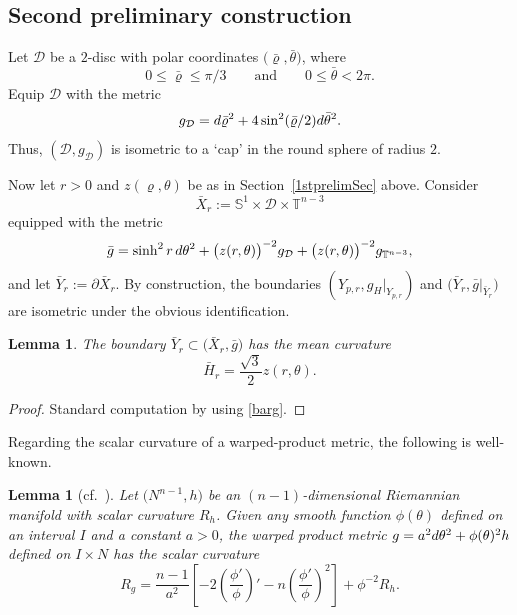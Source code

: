 \documentclass[11pt]{article}
\numberwithin{equation}{section}
\numberwithin{equation}{section}
\newtheorem{Lemma}[Theorem]{Lemma}
\def\S{\mathbb{S}}
\def\T{\mathbb{T}}
\def\Dcal{\mathcal{D}}
\def\ed{{\rm d}}
\begin{document}
\subsection{Second preliminary construction}\label{2ndprelimSec}
Let $\Dcal$ be a $2$-disc with polar coordinates $\bigl(\bar\varrho,\bar\theta\bigr)$, where
\[
	0\le \bar\varrho\le \pi/3 \qquad \mbox{and}\qquad 0\le \bar \theta<2\pi.
\]
Equip $\Dcal$ with the metric
\[
	g_\Dcal = \ed\bar\varrho^2 + 4\sin^2(\bar\varrho/2)\ed\bar\theta^2.
\]
Thus, $(\Dcal, g_\Dcal)$ is isometric to a `cap' in the round sphere of radius $2$.

Now let $r >0$ and $z(\varrho,\theta)$ be as in Section~\ref{1stprelimSec} above. Consider
\begin{equation*}
	\bar X_r := \S^1 \times \Dcal \times \T^{n-3}
\end{equation*}
equipped with the metric
\begin{equation}\label{barg}
\bar g =\sinh^ 2r \,\ed\theta^2 +\bigl(z(r,\theta)\bigr)^{-2} g_\Dcal+\bigl(z(r,\theta)\bigr)^{-2}g_{\T^{n-3}},
\end{equation}
and let $\bar Y_r := \partial \bar X_r$.
By construction, the boundaries $(Y_{p,r}, g_H|_{Y_{p,r}})$ and $\bigl(\bar Y_r, \bar g|_{\bar Y_r}\bigr)$ are isometric under the obvious identification.


\begin{Lemma}%
The boundary $\bar Y_r\subset \bigl(\bar X_r, \bar g\bigr)$ has the mean curvature
\begin{equation}\label{barHr}
\bar H_r=\frac{\sqrt{3}}{2}z(r,\theta).
\end{equation}
\end{Lemma}
\begin{proof}
Standard computation by using \eqref{barg}.
\end{proof}


Regarding the scalar curvature of a warped-product metric,
the following is well-known.

\begin{Lemma}[{cf.~\cite[Proposition 7.33]{GL1983}}]\label{scalarwarp}
Let $\bigl(N^{n-1}, h\bigr)$ be an $(n-1)$-dimensional Riemannian manifold with scalar curvature $R_h$. Given any smooth function $\phi(\theta)$ defined on an
interval $I$ and a constant $a>0$, the warped product metric
$
	g = a^2\ed\theta^2+ \phi(\theta)^2 h
$
defined on $I\times N$ has the scalar curvature
\begin{equation}\label{scalarWarpEq}
R_g=\frac{n-1}{a^2}\left[-2\left(\frac{\phi'}{\phi}\right)'-n\left(\frac{\phi'}{\phi}\right)^2\right]+ \phi^{-2}R_{h}.
\end{equation}
\end{Lemma}
\end{document}
